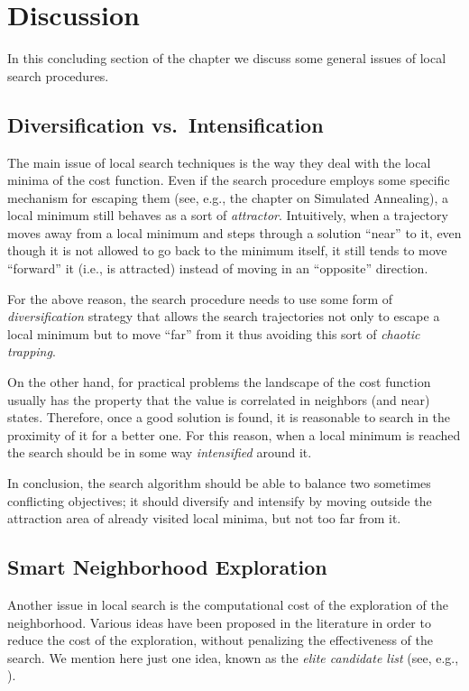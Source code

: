\section{Discussion}\label{sec:discussion}

In this concluding section of the chapter we discuss some general
issues of local search procedures.

\subsection{Diversification vs.\ Intensification}

The main issue of local search techniques is the way they deal
with the local minima of the cost function. Even if the search
procedure employs some specific mechanism for escaping them (see, e.g., the chapter on Simulated Annealing),
a local minimum still behaves as a sort of \emph{attractor}.
Intuitively, when a trajectory moves away from a local minimum and
steps through a solution ``near'' to it, even though it is not allowed
to go back to the minimum itself, it still tends to move ``forward''
it (i.e., is attracted) instead of moving in an ``opposite'' direction.

For the above reason, the search procedure needs to use some form of
\emph{diversification} strategy that allows the search trajectories
not only to escape a local minimum but to move ``far'' from it thus
avoiding this sort of \emph{chaotic trapping}. 
 
On the other hand, for practical problems the landscape of the
cost function usually has the property that the value is
correlated in neighbors (and near) states.  Therefore, once a good
solution is found, it is reasonable to search in the proximity of it
for a better one. For this reason, when a local minimum is reached the
search should be in some way \emph{intensified} around it.  

In conclusion, the search algorithm should be able to balance two
sometimes conflicting objectives; it should diversify and intensify by
moving outside the attraction area of already visited local minima,
but not too far from it.  


\subsection{Smart Neighborhood Exploration}

Another issue in local search is the computational cost of the
exploration of the neighborhood.  Various ideas have been proposed in
the literature in order to reduce the cost of the exploration, without
penalizing the effectiveness of the search. We mention here just one
idea, known as the \emph{elite candidate list} (see, e.g., \cite[Section 3.2]{GlLa97}).


